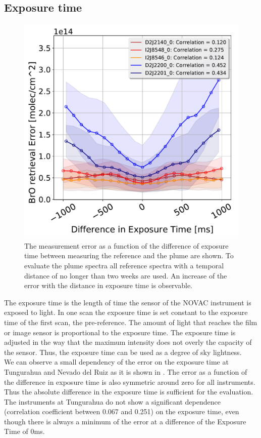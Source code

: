 \subsection{Exposure time}
\begin{figure}
	\centering
	\includegraphics[width=0.7\linewidth]{Bilder/DiffExpTimeallInstruments}
	\caption{The   measurement error as a function of the difference of exposure time between measuring the reference and the plume are shown. To evaluate the plume spectra all reference spectra with a temporal distance of no longer than two weeks are used. An increase of the  error with the distance in exposure time is observable.}
	\label{fig:diffexptime}
\end{figure}
The  exposure time is the length of time the sensor of the NOVAC instrument is exposed to light. In one scan the exposure time is set constant to the exposure time of the first scan, the pre-reference. The amount of light that reaches the film or image sensor is proportional to the exposure time. The exposure time is adjusted in the way that the maximum intensity does not overly the capacity of the sensor. Thus, the exposure time can be used as a degree of sky lightness.\\
We can observe a small dependency of the  error on the exposure time at Tungurahua and Nevado del Ruiz as it is shown in . The   error as a function of the difference in exposure time is also symmetric around zero for all instruments. Thus the absolute difference in the exposure time is sufficient for the evaluation.\\
The instruments at Tungurahua do not show a significant dependence (correlation coefficient between 0.067 and 0.251) on the exposure time, even though there is always a minimum of the  error at a difference of the Exposure Time of 0ms.\\
